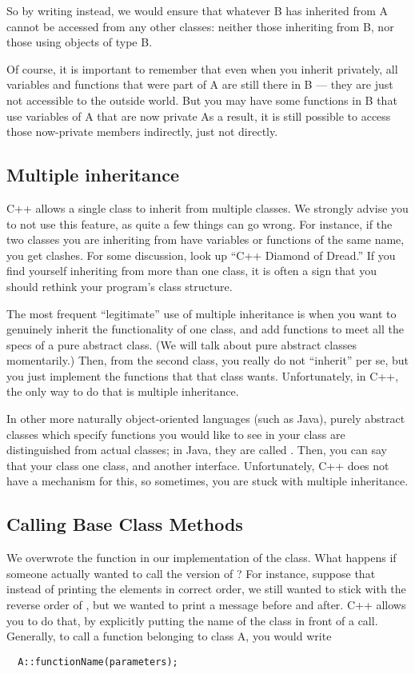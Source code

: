 So by writing  instead, we would ensure that
whatever B has inherited from A cannot be accessed from any other classes:
neither those inheriting from B, nor those using objects of type B.

Of course, it is important to remember that even when you inherit
privately, all variables and functions that were part of A are still
there in B --- they are just not accessible to the outside world.
But you may have some functions in B that use variables of A that are
now private
As a result, it is still possible to access those now-private
members indirectly, just not directly.

\subsection{Multiple inheritance}

C++ allows a single class to inherit from multiple classes.
We strongly advise you to not use this feature, as quite a few things
can go wrong. For instance, if the two classes you are inheriting from
have variables or functions of the same name, you get clashes.
For some discussion, look up ``C++ Diamond of Dread.''
If you find yourself inheriting from more than one class, it is often
a sign that you should rethink your program's class structure. 

The most frequent ``legitimate'' use of multiple inheritance is when
you want to genuinely inherit the functionality of one class, and add
functions to meet all the specs of a pure abstract class.
(We will talk about pure abstract classes momentarily.)
Then, from the second class, you really do not ``inherit'' per se,
but you just implement the functions that that class wants. 
Unfortunately, in C++, the only way to do that is multiple
inheritance. 

In other more naturally object-oriented languages (such as Java),
purely abstract classes which specify functions you would like to see
in your class are distinguished from actual classes;
in Java, they are called .
Then, you can say that your class  one class,
and  another interface.
Unfortunately, C++ does not have a mechanism for this, so sometimes,
you are stuck with multiple inheritance.

\subsection{Calling Base Class Methods}
We overwrote the  function in our implementation of the
 class. What happens if someone actually wanted
to call the  version of ?
For instance, suppose that instead of printing the elements in correct order,
we still wanted to stick with the reverse order of ,
but we wanted to print a message before and after.
C++ allows you to do that, by explicitly putting the name of the class
in front of a call.
Generally, to call a function belonging to class A, you would write
\begin{verbatim}
  A::functionName(parameters);
\end{verbatim}

